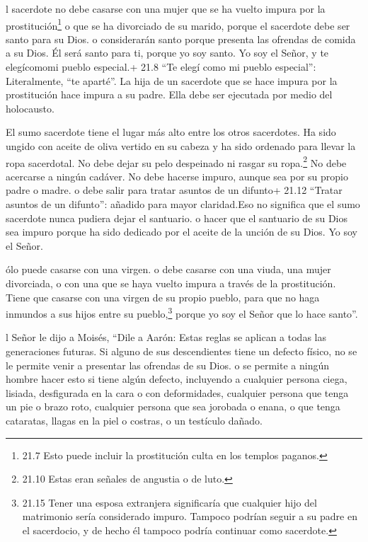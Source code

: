  l sacerdote no debe casarse con una mujer que se ha vuelto
impura por la prostitución\footnote{21.7 Esto puede incluir la
  prostitución culta en los templos paganos.} o que se ha divorciado de
su marido, porque el sacerdote debe ser santo para su Dios. 
o considerarán santo porque presenta las ofrendas de comida a su Dios.
Él será santo para ti, porque yo soy santo. Yo soy el Señor, y te
elegícomomi pueblo especial.+ 21.8 ``Te elegí como mi pueblo especial'':
Literalmente, ``te aparté''.  La hija de un sacerdote que se
hace impura por la prostitución hace impura a su padre. Ella debe ser
ejecutada por medio del holocausto.

 El sumo sacerdote tiene el lugar más alto entre los otros
sacerdotes. Ha sido ungido con aceite de oliva vertido en su cabeza y ha
sido ordenado para llevar la ropa sacerdotal. No debe dejar su pelo
despeinado ni rasgar su ropa.\footnote{21.10 Estas eran señales de
  angustia o de luto.}  No debe acercarse a ningún cadáver.
No debe hacerse impuro, aunque sea por su propio padre o madre.
 o debe salir para tratar asuntos de un difunto+ 21.12
``Tratar asuntos de un difunto'': añadido para mayor claridad.Eso no
significa que el sumo sacerdote nunca pudiera dejar el santuario. o
hacer que el santuario de su Dios sea impuro porque ha sido dedicado por
el aceite de la unción de su Dios. Yo soy el Señor.

 ólo puede casarse con una virgen.  o debe
casarse con una viuda, una mujer divorciada, o con una que se haya
vuelto impura a través de la prostitución. Tiene que casarse con una
virgen de su propio pueblo,  para que no haga inmundos a
sus hijos entre su pueblo,\footnote{21.15 Tener una esposa extranjera
  significaría que cualquier hijo del matrimonio sería considerado
  impuro. Tampoco podrían seguir a su padre en el sacerdocio, y de hecho
  él tampoco podría continuar como sacerdote.} porque yo soy el Señor
que lo hace santo''.

 l Señor le dijo a Moisés,  ``Dile a Aarón:
Estas reglas se aplican a todas las generaciones futuras. Si alguno de
sus descendientes tiene un defecto físico, no se le permite venir a
presentar las ofrendas de su Dios.  o se permite a ningún
hombre hacer esto si tiene algún defecto, incluyendo a cualquier persona
ciega, lisiada, desfigurada en la cara o con deformidades, 
cualquier persona que tenga un pie o brazo roto,  cualquier
persona que sea jorobada o enana, o que tenga cataratas, llagas en la
piel o costras, o un testículo dañado.

